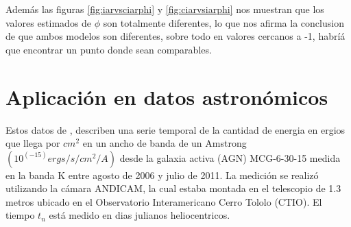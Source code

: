Además las figuras \ref{fig:iarvsciarphi} y \ref{fig:ciarvsiarphi} nos muestran que los valores estimados de $\phi$ son totalmente diferentes, lo que nos afirma la conclusion de que ambos modelos son diferentes, sobre todo en valores cercanos a -1, habríá que encontrar un punto donde sean comparables.
\newpage

\section{Aplicación en datos astronómicos}
Estos datos de \cite{lira2015long}, describen una serie temporal de la cantidad de energia en ergios que llega por $cm^2$ en un ancho de banda de un Amstrong  $(10^{(-15)} ergs/s/cm^2 /A)$ desde la galaxia activa (AGN) MCG-6-30-15 medida en la banda K entre agosto de 2006 y julio de 2011. La medición se realizó utilizando
la cámara ANDICAM, la cual estaba montada en el telescopio de 1.3 metros ubicado en el Observatorio Interamericano Cerro Tololo (CTIO). El tiempo $t_n$ está medido en dias julianos heliocentricos.

